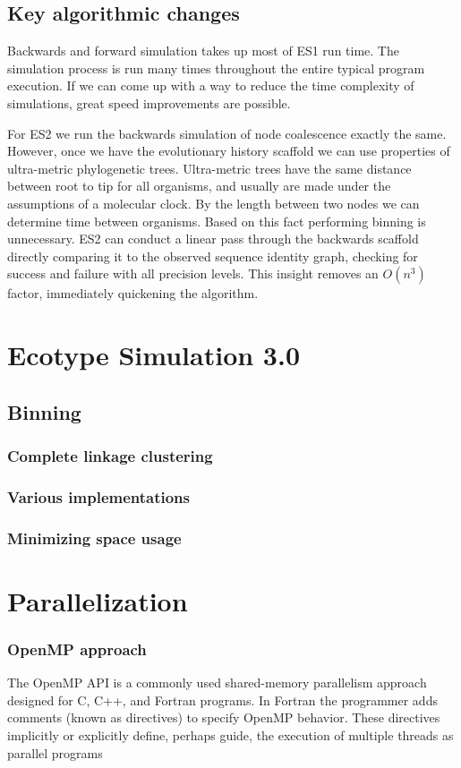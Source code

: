 \subsection*{Key algorithmic changes}


Backwards and forward simulation takes up most of ES1 run time.
The simulation process is run many times throughout the entire typical program execution.
If we can come up with a way to reduce the time complexity of simulations, great speed improvements are possible.

For ES2 we run the backwards simulation of node coalescence exactly the same.
However, once we have the evolutionary history scaffold we can use properties of ultra-metric phylogenetic trees.
Ultra-metric trees have the same distance between root to tip for all organisms, and usually are made under the assumptions of a molecular clock.
By the length between two nodes we can determine time between organisms.
Based on this fact performing binning is unnecessary.
ES2 can conduct a linear pass through the backwards scaffold directly comparing it to the observed sequence identity graph, checking for success and failure with all precision levels.
This insight removes an $O(n^3)$ factor, immediately quickening the algorithm.



\section{Ecotype Simulation 3.0}
\subsection*{Binning}
\subsubsection*{Complete linkage clustering}
\subsubsection*{Various implementations}
\subsubsection*{Minimizing space usage}
\section*{Parallelization}
\subsubsection*{OpenMP approach} %
The OpenMP API is a commonly used shared-memory parallelism approach designed for C, C++, and Fortran programs.
In Fortran the programmer adds comments (known as directives) to specify OpenMP behavior.
These directives implicitly or explicitly define, perhaps guide, the execution of multiple threads as parallel programs

